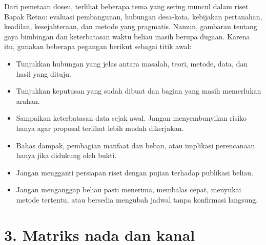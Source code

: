 \documentclass[
  indonesian,
]{article}
\providecommand{\tightlist}{%
  \setlength{\itemsep}{0pt}\setlength{\parskip}{0pt}}
\begin{document}
Dari pemetaan dosen, terlihat beberapa tema yang sering muncul dalam
riset Bapak Retno: evaluasi pembangunan, hubungan desa-kota, kebijakan
pertanahan, keadilan, kesejahteraan, dan metode yang pragmatis. Namun,
gambaran tentang gaya bimbingan dan keterbatasan waktu beliau masih
berupa dugaan. Karena itu, gunakan beberapa pegangan berikut sebagai
titik awal:

\begin{itemize}
\tightlist
\item
  Tunjukkan hubungan yang jelas antara masalah, teori, metode, data, dan
  hasil yang dituju.
\item
  Tunjukkan keputusan yang sudah dibuat dan bagian yang masih memerlukan
  arahan.
\item
  Sampaikan keterbatasan data sejak awal. Jangan menyembunyikan risiko
  hanya agar proposal terlihat lebih mudah dikerjakan.
\item
  Bahas dampak, pembagian manfaat dan beban, atau implikasi perencanaan
  hanya jika didukung oleh bukti.
\item
  Jangan mengganti persiapan riset dengan pujian terhadap publikasi
  beliau.
\item
  Jangan menganggap beliau pasti menerima, membalas cepat, menyukai
  metode tertentu, atau bersedia mengubah jadwal tanpa konfirmasi
  langsung.
\end{itemize}

\section{3. Matriks nada dan kanal}\label{matriks-nada-dan-kanal}
\end{document}

